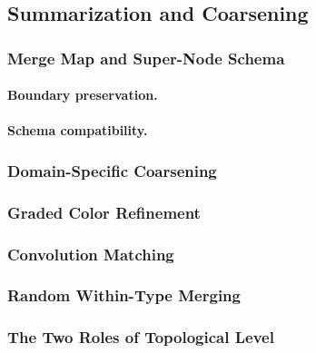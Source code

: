 \subsection{Summarization and Coarsening}
\label{sec:method:reduction:summarization}

\subsubsection{Merge Map and Super-Node Schema}
\label{sec:method:summary:mergemap}

\paragraph{Boundary preservation.}

\paragraph{Schema compatibility.}
\label{sec:method:summary:schema}

\subsubsection{Domain-Specific Coarsening}
\label{sec:method:summary:domain}

\subsubsection{Graded Color Refinement}
\label{sec:method:summary:wl}

\subsubsection{Convolution Matching}
\label{sec:method:summary:convmatch}

\subsubsection{Random Within-Type Merging}
\label{sec:method:summary:random}

\subsubsection{The Two Roles of Topological Level}
\label{sec:method:summary:level}
